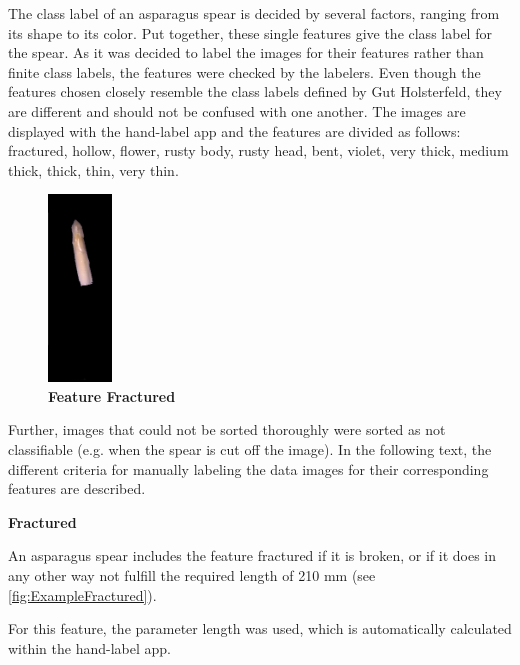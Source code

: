The class label of an asparagus spear is decided by several factors, ranging from its shape to its color. Put together, these single features give the class label for the spear. As it was decided to label the images for their features rather than finite class labels, the features were checked by the labelers. Even though the features chosen closely resemble the class labels defined by Gut Holsterfeld, they are different and should not be confused with one another. The images are displayed with the hand-label app and the features are divided as follows: fractured, hollow, flower, rusty body, rusty head, bent, violet, very thick, medium thick, thick, thin, very thin.

\begin{figure}
  \vspace{20pt}
  \begin{center}
    \includegraphics[width=0.15\textwidth]{Figures/chapter03/example_img_fractured.png}
  \end{center}
  \vspace{-15pt}
  \caption[Example Image Feature Fractured]{ \textbf{Feature Fractured}}
  \vspace{-20pt}
  \label{fig:ExampleFractured}
\end{figure}

Further, images that could not be sorted thoroughly were sorted as not classifiable (e.g. when the spear is cut off the image). In the following text, the different criteria for manually labeling the data images for their corresponding features are described. 

\bigskip
\textbf{Fractured}

An asparagus spear includes the feature fractured if it is broken, or if it does in any other way not fulfill the required length of 210 mm (see \autoref{fig:ExampleFractured}).

For this feature, the parameter length was used, which is automatically calculated within the hand-label app.

